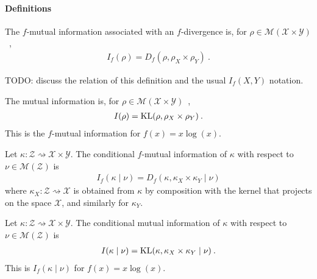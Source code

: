 
\paragraph{Definitions}

\begin{definition}
  \label{def:fMutualInfo}
  The $f$-mutual information associated with an $f$-divergence is, for $\rho \in \mathcal M(\mathcal X \times \mathcal Y)$~,
  \begin{align*}
  I_f(\rho) = D_f(\rho, \rho_X \times \rho_Y) \: .
  \end{align*}
\end{definition}

TODO: discuss the relation of this definition and the usual $I_f(X, Y)$ notation.


\begin{definition}
  \label{def:mutualInfo}
  The mutual information is, for $\rho \in \mathcal M(\mathcal X \times \mathcal Y)$~,
  \begin{align*}
  I(\rho) = \operatorname{KL}(\rho, \rho_X \times \rho_Y) \: .
  \end{align*}
  This is the $f$-mutual information for $f(x) = x \log(x)$.
\end{definition}


\begin{definition}
  \label{def:condFMutualInfo}
  Let $\kappa : \mathcal Z \rightsquigarrow \mathcal X \times \mathcal Y$. The conditional $f$-mutual information of $\kappa$ with respect to $\nu \in \mathcal M(\mathcal Z)$ is
  \begin{align*}
  I_f(\kappa \mid \nu) = D_f(\kappa, \kappa_X \times \kappa_Y \mid \nu)
  \end{align*}
  where $\kappa_X : \mathcal Z \rightsquigarrow \mathcal X$ is obtained from $\kappa$ by composition with the kernel that projects on the space $\mathcal X$, and similarly for $\kappa_Y$.
\end{definition}


\begin{definition}
  \label{def:condMutualInfo}
  Let $\kappa : \mathcal Z \rightsquigarrow \mathcal X \times \mathcal Y$. The conditional mutual information of $\kappa$ with respect to $\nu \in \mathcal M(\mathcal Z)$ is
  \begin{align*}
  I(\kappa \mid \nu) = \operatorname{KL}(\kappa, \kappa_X \times \kappa_Y \mid \nu) \: .
  \end{align*}
  This is $I_f(\kappa \mid \nu)$ for $f(x) = x \log(x)$.
\end{definition}


